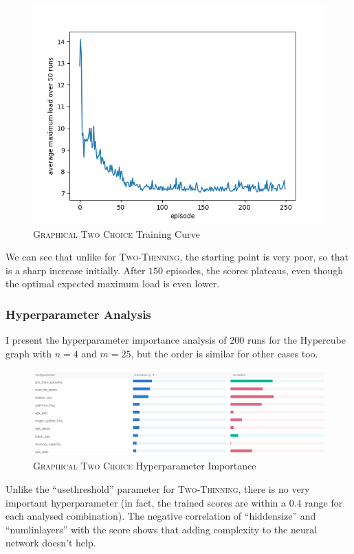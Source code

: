 \begin{figure}[h!] \label{graphical-two-choice-hyperparameter-importance}
    \centering
    \includegraphics[scale=1.0]{Chapter4/Figs/training_progression_hypercube_4_25.png}
    \caption{\textsc{Graphical Two Choice} Training Curve}
\end{figure}

We can see that unlike for \textsc{Two-Thinning}, the starting point is very poor, so that is a sharp increase initially. After $150$ episodes, the scores plateaus, even though the optimal expected maximum load is even lower.



\subsubsection{Hyperparameter Analysis}

I present the hyperparameter importance analysis of $200$ runs for the Hypercube graph with $n=4$ and $m=25$, but the order is similar for other cases too.

\begin{figure}[h!] \label{graphical-two-choice-hyperparameter-importance}
    \centering
    \includegraphics[scale=0.4]{Chapter4/Figs/graphical_two_choice_hypercube_4_25_importance.png}
    \caption{\textsc{Graphical Two Choice} Hyperparameter Importance}
\end{figure}


Unlike the ``use\textunderscore threshold'' parameter for \textsc{Two-Thinning}, there is no very important hyperparameter (in fact, the trained scores are within a $0.4$ range for each analysed combination). The negative correlation of ``hidden\textunderscore size'' and ``num\textunderscore lin\textunderscore layers'' with the score shows that adding complexity to the neural network doesn't help.
